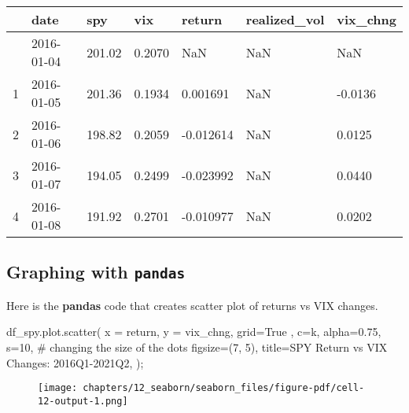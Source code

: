 \documentclass[
  letterpaper,
  DIV=11,
  numbers=noendperiod]{scrreprt}
\newenvironment{Shaded}{\begin{snugshade}}{\end{snugshade}}
\newcommand{\CommentTok}[1]{\textcolor[rgb]{0.37,0.37,0.37}{#1}}
\newcommand{\DecValTok}[1]{\textcolor[rgb]{0.68,0.00,0.00}{#1}}
\newcommand{\FloatTok}[1]{\textcolor[rgb]{0.68,0.00,0.00}{#1}}
\newcommand{\NormalTok}[1]{\textcolor[rgb]{0.00,0.23,0.31}{#1}}
\newcommand{\OperatorTok}[1]{\textcolor[rgb]{0.37,0.37,0.37}{#1}}
\newcommand{\StringTok}[1]{\textcolor[rgb]{0.13,0.47,0.30}{#1}}
\newcommand{\VariableTok}[1]{\textcolor[rgb]{0.07,0.07,0.07}{#1}}
\begin{document}
\begin{longtable}[]{@{}lllllll@{}}
\toprule\noalign{}
& date & spy & vix & return & realized\_vol & vix\_chng \\
\midrule\noalign{}
\endhead
\bottomrule\noalign{}
\endlastfoot
0 & 2016-01-04 & 201.02 & 0.2070 & NaN & NaN & NaN \\
1 & 2016-01-05 & 201.36 & 0.1934 & 0.001691 & NaN & -0.0136 \\
2 & 2016-01-06 & 198.82 & 0.2059 & -0.012614 & NaN & 0.0125 \\
3 & 2016-01-07 & 194.05 & 0.2499 & -0.023992 & NaN & 0.0440 \\
4 & 2016-01-08 & 191.92 & 0.2701 & -0.010977 & NaN & 0.0202 \\
\end{longtable}

\hypertarget{graphing-with-pandas-2}{%
\subsection{\texorpdfstring{Graphing with
\texttt{pandas}}{Graphing with pandas}}\label{graphing-with-pandas-2}}

Here is the \textbf{pandas} code that creates scatter plot of returns vs
VIX changes.

\begin{Shaded}
\begin{Highlighting}[]
\NormalTok{df\_spy.plot.scatter(}
\NormalTok{    x }\OperatorTok{=} \StringTok{\textquotesingle{}return\textquotesingle{}}\NormalTok{,}
\NormalTok{    y }\OperatorTok{=} \StringTok{\textquotesingle{}vix\_chng\textquotesingle{}}\NormalTok{,}
\NormalTok{    grid}\OperatorTok{=}\VariableTok{True}\NormalTok{ ,  }
\NormalTok{    c}\OperatorTok{=}\StringTok{\textquotesingle{}k\textquotesingle{}}\NormalTok{,}
\NormalTok{    alpha}\OperatorTok{=}\FloatTok{0.75}\NormalTok{,}
\NormalTok{    s}\OperatorTok{=}\DecValTok{10}\NormalTok{, }\CommentTok{\# changing the size of the dots}
\NormalTok{    figsize}\OperatorTok{=}\NormalTok{(}\DecValTok{7}\NormalTok{, }\DecValTok{5}\NormalTok{),}
\NormalTok{    title}\OperatorTok{=}\StringTok{\textquotesingle{}SPY Return vs VIX Changes: 2016Q1{-}2021Q2\textquotesingle{}}\NormalTok{,}
\NormalTok{)}\OperatorTok{;}
\end{Highlighting}
\end{Shaded}

\begin{figure}[H]

{\centering \texttt{[image: chapters/12\_seaborn/seaborn\_files/figure-pdf/cell-12-output-1.png]}

}

\end{figure}
\end{document}
